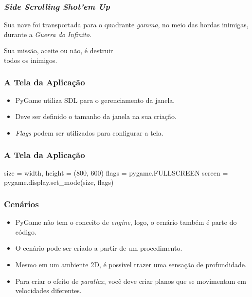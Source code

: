 \begin{frame}
    \frametitle{\textit{Side Scrolling Shot'em Up}}
    {\large\bfseries
    \begin{center}
        Sua nave foi transportada para o quadrante \textit{gamma}, no meio das hordas
        inimigas, durante a \textit{Guerra do Infinito}.
        \vspace{1cm}

        Sua missão, aceite ou não, é destruir\\todos os inimigos.
    \end{center}
    }
\end{frame}

\begin{frame}[fragile]
    \frametitle{A Tela da Aplicação}

    \begin{itemize}
        \item PyGame utiliza SDL para o gerenciamento da janela.
        \item Deve ser definido o tamanho da janela na sua criação.
        \item \textit{Flags} podem ser utilizados para configurar a tela.
    \end{itemize}

\end{frame}

\begin{frame}[fragile]
    \frametitle{A Tela da Aplicação}
    \begin{python}
        size = width, height = (800, 600)
        flags = pygame.FULLSCREEN
        screen = pygame.display.set_mode(size, flags)
    \end{python}
\end{frame}

\begin{frame}[fragile]
    \frametitle{Cenários}

    \begin{itemize}
        \item PyGame não tem o conceito de \textit{engine}, logo, o cenário
        também é parte do código.
        \item O cenário pode ser criado a partir de um procedimento.
        \item Mesmo em um ambiente 2D, é possível trazer uma sensação de
        profundidade.
        \item Para criar o efeito de \textit{parallax}, você deve criar planos
        que se movimentam em velocidades diferentes.
    \end{itemize}
\end{frame}

